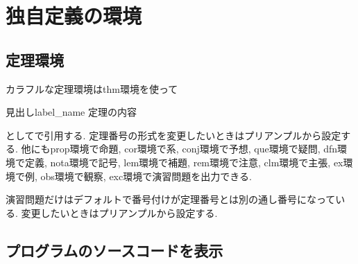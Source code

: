 \documentclass[11pt,a4paper,oneside,lualatex]{ltjsarticle} %
\begin{document}
\section{独自定義の環境} \label{sec:environment}



\subsection{定理環境} \label{subsec:thm}



カラフルな定理環境はthm環境を使って
\begin{thm}{見出し}{label_name}
	定理の内容
\end{thm}
としてで引用する.
定理番号の形式を変更したいときはプリアンプルから設定する.
他にもprop環境で命題, cor環境で系, conj環境で予想, que環境で疑問, dfn環境で定義, nota環境で記号, lem環境で補題, rem環境で注意, clm環境で主張, ex環境で例, obs環境で観察, exc環境で演習問題を出力できる.
\begin{dfn}{}{}
	
\end{dfn}
\begin{lem}{}{}
	
\end{lem}
\begin{exc}{}{}
	演習問題だけはデフォルトで番号付けが定理番号とは別の通し番号になっている.
	変更したいときはプリアンプルから設定する.
\end{exc}


\subsection{プログラムのソースコードを表示} \label{subsec:program}

\end{document}
